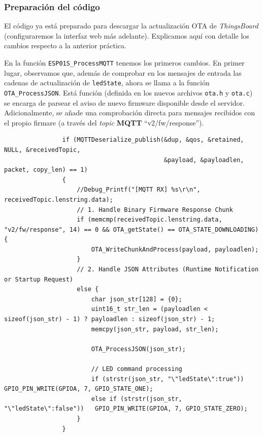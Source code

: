 \documentclass[../main.tex]{subfiles}
\begin{document}
        \subsubsection{Preparación del código}

            El código ya está preparado para descargar la actualización OTA de \emph{ThingsBoard} (configuraremos la interfaz web más adelante). Explicamos aquí con detalle los cambios respecto a la anterior práctica.

            En la función \texttt{ESP01S\_ProcessMQTT} tenemos los primeros cambios. En primer lugar, observamos que, además de comprobar en los mensajes de entrada las cadenas de actualización de \texttt{ledState}, ahora se llama a la función \texttt{OTA\_ProcessJSON}. Está función (definida en los nuevos archivos \texttt{ota.h} y \texttt{ota.c}) se encarga de parsear el aviso de nuevo firmware disponible desde el servidor. Adicionalmente, se añade una comprobación directa para mensajes recibidos con el propio firmare (a través del \emph{topic} \textbf{MQTT} ``v2/fw/response'').

            \begin{lstlisting}
                if (MQTTDeserialize_publish(&dup, &qos, &retained, NULL, &receivedTopic,
                                            &payload, &payloadlen, packet, copy_len) == 1)
                {
                    //Debug_Printf("[MQTT RX] %s\r\n", receivedTopic.lenstring.data);
                    // 1. Handle Binary Firmware Response Chunk
                    if (memcmp(receivedTopic.lenstring.data, "v2/fw/response", 14) == 0 && OTA_getState() == OTA_STATE_DOWNLOADING) {
                        OTA_WriteChunkAndProcess(payload, payloadlen);
                    }
                    // 2. Handle JSON Attributes (Runtime Notification or Startup Request)
                    else {
                        char json_str[128] = {0};
                        uint16_t str_len = (payloadlen < sizeof(json_str) - 1) ? payloadlen : sizeof(json_str) - 1;
                        memcpy(json_str, payload, str_len);

                        OTA_ProcessJSON(json_str);

                        // LED command processing
                        if (strstr(json_str, "\"ledState\":true"))        GPIO_PIN_WRITE(GPIOA, 7, GPIO_STATE_ONE);
                        else if (strstr(json_str, "\"ledState\":false"))   GPIO_PIN_WRITE(GPIOA, 7, GPIO_STATE_ZERO);
                    }
                }
            \end{lstlisting}
\end{document}
